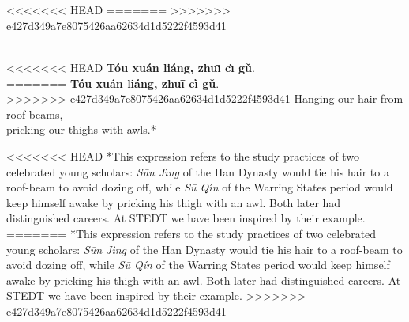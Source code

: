 \onecolumn
\section*{}
<<<<<<< HEAD
=======
>>>>>>> e427d349a7e8075426aa62634d1d5222f4593d41

\hfill
\hfill
\begin{minipage}[c]{0.3\linewidth}
\\
<<<<<<< HEAD
\textbf{Tóu xuán liáng, zhuı̄ cı̀ gǔ}.\\
=======
\textbf{Tóu xuán liáng, zhuī cì gǔ}.\\
>>>>>>> e427d349a7e8075426aa62634d1d5222f4593d41
Hanging our hair from roof-beams,\\
pricking our thighs with awls.*
\end{minipage}
\hfill
\hfill

\bigskip

\bigskip

\bigskip

\bigskip

\hfill
\begin{minipage}[c]{0.3\linewidth}
<<<<<<< HEAD
*This expression refers to the study practices of two celebrated young scholars: \textit{Sūn Jı̀ng}  of the Han Dynasty would tie his hair to a roof-beam to avoid dozing off, while \textit{Sū Qı́n}  of the Warring States period would keep himself awake by pricking his thigh with an awl. Both later had distinguished careers. At STEDT we have been inspired by their example.
=======
*This expression refers to the study practices of two celebrated young scholars: \textit{Sūn Jìng}  of the Han Dynasty would tie his hair to a roof-beam to avoid dozing off, while \textit{Sū Qín}  of the Warring States period would keep himself awake by pricking his thigh with an awl. Both later had distinguished careers. At STEDT we have been inspired by their example.
>>>>>>> e427d349a7e8075426aa62634d1d5222f4593d41
\end{minipage}
\hfill
\hfill

\twocolumn